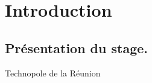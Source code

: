 \chapter*{Introduction}
\section{Présentation du stage.}

Technopole de la Réunion~~ \\\\

\lipsum[3]
